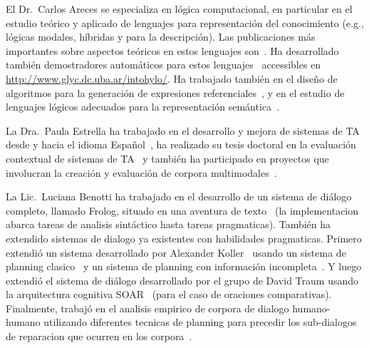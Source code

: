 \begin{myitemize}

\item El Dr.\ Carlos Areces se especializa en l\'ogica computacional,
en particular en el estudio te\'orico y aplicado de lenguajes para
representaci\'on del conocimiento (e.g., l\'ogicas modales, h\'ibridas y
para la descripci\'on).  Las publicaciones
m\'as importantes sobre aspectos te\'oricos en estos lenguajes
son~\citep{ABM01,arec:hybr05b}.  Ha desarrollado tambi\'en demostradores
autom\'aticos para estos lenguajes~\citep{ANR01,arec:hylo02a,AG06,Hoffmann2007}
accessibles en \url{http://www.glyc.dc.uba.ar/intohylo/}.
Ha trabajado tambi\'en en el dise\~no de algoritmos para la generaci\'on de
expresiones referenciales~\citep{AKS08}, y en el estudio de lenguajes l\'ogicos
adecuados para la representaci\'on sem\'antica~\citep{AF08}.



\item La Dra.\ Paula Estrella ha trabajado en el desarrollo y mejora de sistemas de TA desde y hacia el idioma Espa\~nol~\citep{estr:expe05}, ha realizado su tesis doctoral en la evaluaci\'on contextual de sistemas de TA~\citep{estr:impr08, estr:femt09} y tambi\'en ha participado en proyectos que involucran la creaci\'on y evaluaci\'on de corpora multimodales~\citep{pope:estr07}.

\item La Lic.\ Luciana Benotti ha trabajado en el desarrollo de un sistema de
di\'alogo completo, llamado Frolog, situado en una aventura de
texto~\citep{benotti09b} (la implementacion abarca tareas de analisis
sint\'actico hasta tareas pragmaticas). Tambi\'en ha extendido sistemas de
dialogo ya existentes con habilidades pragmaticas. Primero extendi\'o un
sistema desarrollado por Alexander Koller~\citep{koller04} usando un sistema de
planning clasico~\citep{benotti07} y un sistema de planning con informaci\'on
incompleta~\citep{benotti08}. Y luego extendi\'o el sistema de di\'alogo
desarrollado por el grupo de David Traum usando la arquitectura cognitiva
SOAR~\citep{benotti09a} (para el caso de oraciones comparativas). Finalmente,
trabaj\'o en el analisis empirico de corpora de dialogo humano-humano utilizando
diferentes tecnicas de planning para precedir los sub-dialogos de reparacion que
ocurren en los corpora~\citep{benotti09c}.

\end{myitemize}

